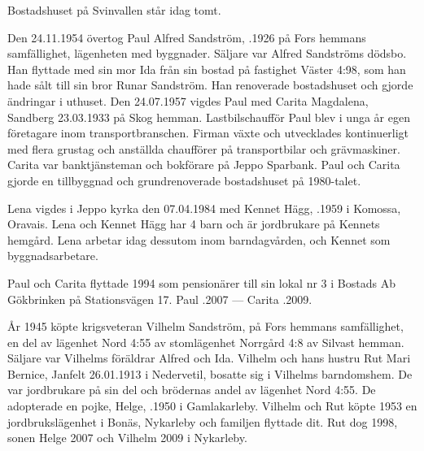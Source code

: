 Bostadshuset på Svinvallen står idag tomt.


%
Den 24.11.1954 övertog Paul Alfred Sandström, .1926 på Fors hemmans samfällighet, lägenheten med byggnader. Säljare var Alfred Sandströms dödsbo. Han flyttade med sin mor Ida från sin bostad på fastighet Väster 4:98, som han hade sålt till sin bror Runar Sandström. Han renoverade bostadshuset och gjorde ändringar i uthuset. Den 24.07.1957 vigdes Paul med Carita Magdalena, \textborn Sandberg 23.03.1933 på Skog hemman. Lastbilschaufför Paul blev i unga år egen företagare inom transportbranschen. Firman växte och utvecklades kontinuerligt med flera grustag och anställda chaufförer på transportbilar och grävmaskiner. Carita var banktjänsteman och bokförare på Jeppo Sparbank. Paul och Carita gjorde en tillbyggnad och grundrenoverade bostadshuset på 1980-talet.
\begin{jhchildren}
  \item {}
  \item {}
\end{jhchildren}
Lena vigdes i Jeppo kyrka den 07.04.1984 med Kennet Hägg, .1959 i Komossa, Oravais. Lena och Kennet Hägg har 4 barn och är jordbrukare på Kennets hemgård. Lena arbetar idag dessutom inom barndagvården, och Kennet som byggnadsarbetare.

Paul och Carita flyttade 1994 som pensionärer till sin lokal nr 3 i Bostads Ab Gökbrinken på Stationsvägen 17.
Paul .2007  ---  Carita .2009.


%
År 1945 köpte krigsveteran Vilhelm Sandström,  på Fors hemmans samfällighet, en del av lägenhet Nord 4:55 av stomlägenhet Norrgård 4:8 av Silvast hemman. Säljare var Vilhelms föräldrar Alfred och Ida. Vilhelm och hans hustru Rut Mari Bernice, \textborn Janfelt 26.01.1913 i Nedervetil, bosatte sig i Vilhelms barndomshem. De var jordbrukare på sin del och brödernas andel av lägenhet Nord 4:55. De adopterade en pojke, Helge, .1950 i Gamlakarleby. Vilhelm och Rut köpte 1953 en jordbrukslägenhet i Bonäs, Nykarleby och familjen flyttade dit. Rut dog 1998, sonen Helge 2007 och Vilhelm 2009 i Nykarleby.

